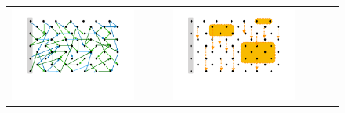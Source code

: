   \begin{figure}[htb]
 \begin{tabular}{clclc}
\begin{minipage}{0.29\textwidth}
 \includegraphics[width=\linewidth, trim=100  120 130 60,clip]{diagrams/neccSuff_yellow_A.pdf}
\end{minipage}
 & \ \ \ & 
\begin{minipage}{0.29\textwidth}
 \includegraphics[width=\linewidth, trim=100  120 130 60,clip]{diagrams/neccSuff_yellow_B.pdf}
\end{minipage}
 & \ \ \ &
\begin{minipage}{0.29\textwidth}

\end{minipage}
\end{tabular}
\end{figure}
